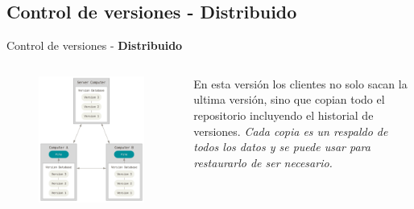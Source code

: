 \documentclass{beamer}
\begin{document}
\subsection{Control de versiones - \textbf{Distribuido}}
\begin{frame}{Control de versiones - \textbf{Distribuido}}
\begin{columns}
 \begin{figure}
 \centering
 \includegraphics[scale=0.2]{Imagenes/distributed_vcs}
 \end{figure}
 
  \footnotesize
 En esta versión los clientes no solo sacan la ultima versión, sino que copian todo el repositorio incluyendo el historial de versiones. \textit{Cada copia es un respaldo de todos los datos y se puede usar para restaurarlo de ser necesario.}
 \end{columns}
\end{frame}
\end{document}
